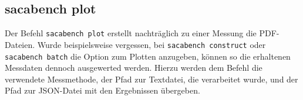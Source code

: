 \subsection{sacabench plot}
\label{framework:cli:sacabench-plot}

Der Befehl \texttt{sacabench plot} erstellt nachträglich zu einer Messung die PDF-Dateien. 
Wurde beispielsweise vergessen, bei \texttt{sacabench construct} oder \texttt{sacabench batch} die Option zum Plotten anzugeben, können so die erhaltenen Messdaten dennoch ausgewerted werden.
Hierzu werden dem Befehl die verwendete Messmethode, der Pfad zur Textdatei, die verarbeitet wurde, und der Pfad zur JSON-Datei mit den Ergebnissen übergeben.
